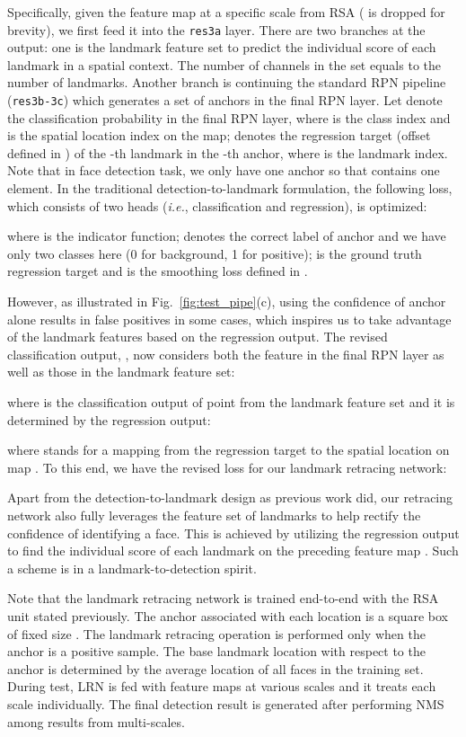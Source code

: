 \documentclass[10pt,twocolumn,letterpaper]{article}
\begin{document}
Specifically,
given the feature map  at a specific scale from RSA ( is dropped for brevity), we first feed it into the \texttt{res3a} layer. There are two branches at the output: one is the landmark feature set  to predict the individual score of each landmark in a spatial context. The number of channels in the set equals to the number of landmarks. Another branch is continuing the standard RPN \cite{faster_rcnn} pipeline (\texttt{res3b-3c}) which generates a set of anchors in the final RPN layer.
Let  denote the classification probability in the final RPN layer, where  is the class index and  is the spatial location index on the map;  denotes the regression target (offset defined in \cite{fast_rcnn}) of the -th landmark in the -th anchor, where  is the landmark index. Note that in face detection task, we only have one anchor so that   contains one element.
In the traditional detection-to-landmark formulation, the following loss, which consists of two heads (\textit{i.e.}, classification and regression), is optimized:

where  is the indicator function;  denotes the correct label of anchor  and we have only two classes here (0 for background, 1 for positive);  is the ground truth regression target and  is the smoothing  loss defined in \cite{fast_rcnn}.

However, as illustrated in Fig.~\ref{fig:test_pipe}(c), using the confidence of anchor  alone results in 
false positives in some cases, which inspires us to take advantage of the landmark features based on the regression output. The revised classification output, , now considers both the feature in the final RPN layer as well as those in the landmark feature set:

where  is the classification output of point  from the landmark feature set 
and it is determined by the regression output:

where  stands for a mapping from the regression target to the spatial location on map . To this end, we have the revised loss for our landmark retracing network:

Apart from the detection-to-landmark design as previous work did, our retracing network  also fully leverages
the feature set of landmarks to help rectify the confidence of identifying a face. This is achieved by utilizing the regression output  to find the individual score of each landmark on the preceding feature map . Such a scheme is in a landmark-to-detection spirit.  

Note that the landmark retracing network is trained end-to-end with the RSA unit stated previously. The anchor associated with each location  is a square box of fixed size .
The landmark retracing operation is performed only when the anchor is a positive sample. The base landmark location with respect to the anchor is determined by the average location of all faces in the training set.
During test, LRN is fed with feature maps at various scales and it treats each scale individually. The final detection result is generated after performing NMS among results from multi-scales.
\end{document}
